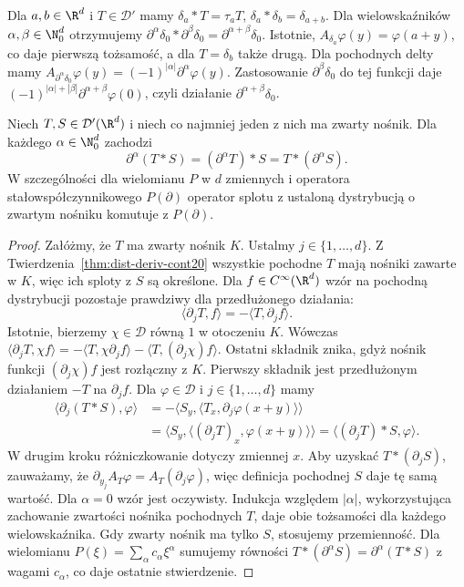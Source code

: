 \begin{przyklad}
\label{ex:delta-convolution21}
Dla $a,b\in\R^d$ i $T\in\mathcal D'$ mamy
$\delta_a*T=\tau_aT$, $\delta_a*\delta_b=\delta_{a+b}$.
Dla wielowskaźników $\alpha,\beta\in\N_0^d$ otrzymujemy
$\partial^\alpha\delta_0*\partial^\beta\delta_0
=\partial^{\alpha+\beta}\delta_0$.
Istotnie, $A_{\delta_a}\varphi(y)=\varphi(a+y)$,
co daje pierwszą tożsamość, a dla $T=\delta_b$
także drugą. Dla pochodnych delty mamy
$A_{\partial^\alpha\delta_0}\varphi(y)
=(-1)^{|\alpha|}\partial^\alpha\varphi(y)$.
Zastosowanie $\partial^\beta\delta_0$ do tej funkcji
daje $(-1)^{|\alpha|+|\beta|}
\partial^{\alpha+\beta}\varphi(0)$, czyli działanie
$\partial^{\alpha+\beta}\delta_0$.
\end{przyklad}

\begin{twierdzenie}
\label{thm:convolution-derivative21}
Niech $T,S\in\mathcal D'(\R^d)$ i niech co najmniej
jeden z nich ma zwarty nośnik. Dla każdego
$\alpha\in\N_0^d$ zachodzi
\[
 \partial^\alpha(T*S)
 =(\partial^\alpha T)*S
 =T*(\partial^\alpha S).
\]
W szczególności dla wielomianu $P$ w $d$ zmiennych
i operatora stałowspółczynnikowego $P(\partial)$
operator splotu z ustaloną dystrybucją o zwartym
nośniku komutuje z $P(\partial)$.
\end{twierdzenie}
\begin{proof}
Załóżmy, że $T$ ma zwarty nośnik $K$. Ustalmy
$j\in\{1,\ldots,d\}$.
Z Twierdzenia~\ref{thm:dist-deriv-cont20} wszystkie
pochodne $T$ mają nośniki zawarte w $K$, więc ich sploty
z $S$ są określone. Dla $f\in C^\infty(\R^d)$
wzór na pochodną dystrybucji pozostaje prawdziwy
dla przedłużonego działania:
\[
 \langle\partial_jT,f\rangle
 =-\langle T,\partial_jf\rangle.
\]
Istotnie, bierzemy $\chi\in\mathcal D$ równą $1$
w otoczeniu $K$. Wówczas
$\langle\partial_jT,\chi f\rangle
=-\langle T,\chi\partial_jf\rangle
-\langle T,(\partial_j\chi)f\rangle$.
Ostatni składnik znika, gdyż nośnik funkcji
$(\partial_j\chi)f$ jest rozłączny z $K$.
Pierwszy składnik jest przedłużonym działaniem
$-T$ na $\partial_jf$. Dla
$\varphi\in\mathcal D$ i $j\in\{1,\ldots,d\}$ mamy
\[
 \begin{aligned}
 \langle\partial_j(T*S),\varphi\rangle
 &=-\langle S_y,\langle T_x,\partial_j\varphi(x+y)\rangle\rangle\\
 &=\langle S_y,\langle(\partial_jT)_x,\varphi(x+y)\rangle\rangle
 =\langle(\partial_jT)*S,\varphi\rangle.
 \end{aligned}
\]
W drugim kroku różniczkowanie dotyczy zmiennej $x$.
Aby uzyskać $T*(\partial_jS)$, zauważamy, że
$\partial_{y_j}A_T\varphi=A_T(\partial_j\varphi)$,
więc definicja pochodnej $S$ daje tę samą wartość.
Dla $\alpha=0$ wzór jest oczywisty. Indukcja względem
$|\alpha|$, wykorzystująca zachowanie zwartości nośnika
pochodnych $T$, daje obie tożsamości dla każdego
wielowskaźnika. Gdy zwarty nośnik ma tylko $S$,
stosujemy przemienność. Dla wielomianu
$P(\xi)=\sum_\alpha c_\alpha\xi^\alpha$ sumujemy
równości $T*(\partial^\alpha S)=\partial^\alpha(T*S)$
z wagami $c_\alpha$, co daje ostatnie stwierdzenie.
\end{proof}

